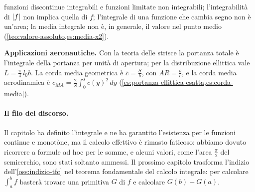 \begin{puntichiave}
funzioni discontinue integrabili e funzioni limitate non integrabili; l'integrabilità
di $\lvert f\rvert$ non implica quella di $f$; l'integrale di una funzione che cambia segno non
è un'area; la media integrale non è, in generale, il valore nel punto medio
(\cref{teo:valore-assoluto,es:media-x2}).
\item \textbf{Applicazioni aeronautiche.} Con la teoria delle strisce la portanza
totale è l'integrale della portanza per unità di apertura; per la distribuzione
ellittica vale $L=\frac\pi4\,l_{0}b$. La corda media geometrica è $\bar c=\frac Sb$, con
$AR=\frac b{\bar c}$, e la corda media aerodinamica è
$c_{MA}=\frac2S\int_{0}^{s}c(y)^{2}\,dy$
(\cref{es:portanza-ellittica-esatta,es:corda-media}).
\end{puntichiave}

\paragraph{Il filo del discorso.} Il capitolo ha definito l'integrale e ne ha
garantito l'esistenza per le funzioni continue e monotòne, ma il calcolo effettivo è
rimasto faticoso: abbiamo dovuto ricorrere a formule ad hoc per le somme, e alcuni
valori, come l'area $\frac\pi2$ del semicerchio, sono stati soltanto ammessi. Il
prossimo capitolo trasforma l'indizio dell'\cref{oss:indizio-tfc} nel teorema
fondamentale del calcolo integrale: per calcolare $\int_{a}^{b}f$ basterà trovare una
primitiva $G$ di $f$ e calcolare $G(b)-G(a)$.
